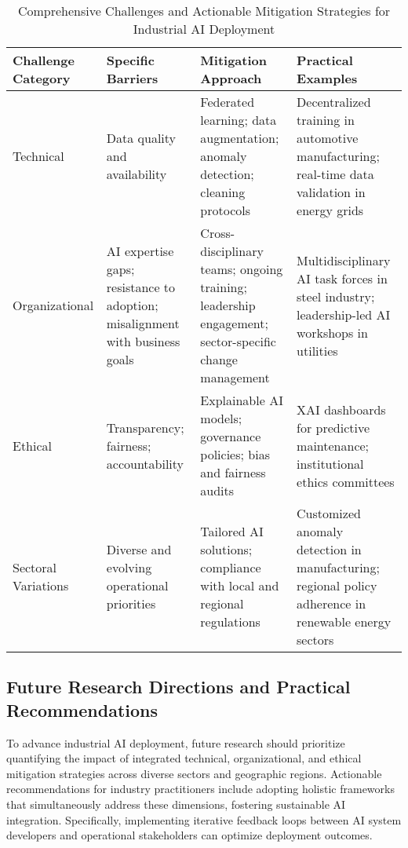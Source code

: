 \documentclass[sigconf]{acmart}
\begin{document}
\begin{table*}[htbp]
\centering
\caption{Comprehensive Challenges and Actionable Mitigation Strategies for Industrial AI Deployment}
\label{tab:barrier-mitigation}
\begin{adjustbox}{max width=\textwidth}
\begin{tabular}{@{}llll@{}}
\toprule
\textbf{Challenge Category} & \textbf{Specific Barriers} & \textbf{Mitigation Approach} & \textbf{Practical Examples} \\ \midrule
Technical & Data quality and availability & Federated learning; data augmentation; anomaly detection; cleaning protocols & Decentralized training in automotive manufacturing; real-time data validation in energy grids \\
Organizational & AI expertise gaps; resistance to adoption; misalignment with business goals & Cross-disciplinary teams; ongoing training; leadership engagement; sector-specific change management & Multidisciplinary AI task forces in steel industry; leadership-led AI workshops in utilities \\
Ethical & Transparency; fairness; accountability & Explainable AI models; governance policies; bias and fairness audits & XAI dashboards for predictive maintenance; institutional ethics committees \\
Sectoral Variations & Diverse and evolving operational priorities & Tailored AI solutions; compliance with local and regional regulations & Customized anomaly detection in manufacturing; regional policy adherence in renewable energy sectors \\ \bottomrule
\end{tabular}
\end{adjustbox}
\end{table*}

\subsection{Future Research Directions and Practical Recommendations}

To advance industrial AI deployment, future research should prioritize quantifying the impact of integrated technical, organizational, and ethical mitigation strategies across diverse sectors and geographic regions. Actionable recommendations for industry practitioners include adopting holistic frameworks that simultaneously address these dimensions, fostering sustainable AI integration. Specifically, implementing iterative feedback loops between AI system developers and operational stakeholders can optimize deployment outcomes.
\end{document}
